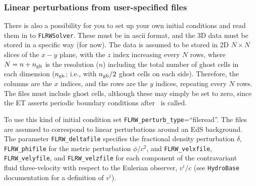 \subsubsection{Linear perturbations from user-specified files}

There is also a possibility for you to set up your own initial conditions and read them in to \texttt{FLRWSolver}. These must be in ascii format, and the 3D data must be stored in a specific way (for now). The data is assumed to be stored in 2D $N\times N$ slices of the $x-y$ plane, with the $z$ index increasing every $N$ rows, where $N=n+n_{\rm gh}$ is the resolution ($n$) including the total number of ghost cells in each dimension ($n_{\rm gh}$; i.e., with $n_{\rm gh}/2$ ghost cells on each side). Therefore, the columns are the $x$ indices, and the rows are the $y$ indices, repeating every $N$ rows. The files must include ghost cells, although these may simply be set to zero, since the ET asserts periodic boundary conditions after \flrwsolver\ is called.

To use this kind of initial condition set \texttt{FLRW\_perturb\_type}=``fileread''. The files are assumed to correspond to linear perturbations around an EdS background. The parameter \texttt{FLRW\_deltafile} specifies the fractional density perturbation $\delta$, \texttt{FLRW\_phifile} for the metric perturbation $\phi/c^2$, and \texttt{FLRW\_velxfile}, \texttt{FLRW\_velyfile}, and \texttt{FLRW\_velzfile} for each component of the contravariant fluid three-velocity with respect to the Eulerian observer, $v^i/c$ (see \texttt{HydroBase} documentation for a definition of $v^i$). %



